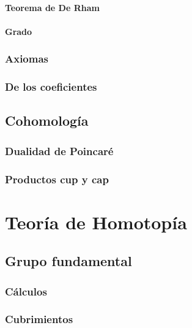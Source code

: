 \documentclass[12pt]{book}
\begin{document}
\subsection{Teorema de De Rham}


\subsection{Grado}




\section{Axiomas}	


	
	
\section{De los coeficientes}	





\chapter{Cohomología}


\section{Dualidad de Poincaré}

\section{Productos cup y cap}




\part{Teoría de Homotopía}


\chapter{Grupo fundamental}

\section{Cálculos}

\section{Cubrimientos}
\end{document}
